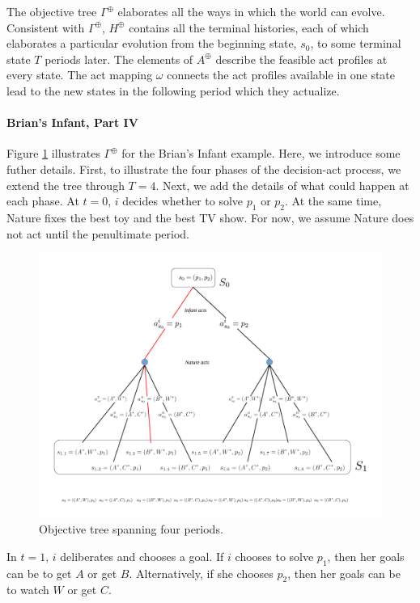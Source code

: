 \documentclass[
11pt,
titlepage,
reqno,
]{article}%
\theoremstyle{definition}
\begin{document}
The objective tree $\Gamma^\oplus$ elaborates all the ways in which the world can evolve.
Consistent with $\Gamma^\oplus$, $H^\oplus$ contains all the terminal histories, each of which elaborates a particular evolution from the beginning state, $s_0$, to some terminal state $T$ periods later.
The elements of $A^\oplus$ describe the feasible act profiles at every state.
The act mapping $\omega$ connects the act profiles available in one state lead to the new states in the following period which they actualize.

\paragraph{Brian's Infant, Part IV}
Figure \ref{Diag: p-04} illustrates $\Gamma^\oplus$ for the Brian's Infant example. 
Here, we introduce some futher details.
First, to illustrate the four phases of the decision-act process, we extend the tree through $T=4$.
Next, we add the details of what could happen at each phase.
At $t=0$, $i$ decides whether to solve $p_1$ or $p_2$.
At the same time, Nature fixes the best toy and the best TV show. 
For now, we assume Nature does not act until the penultimate period.

\begin{figure}[h!]
	\centering
	\includegraphics*[page=4,trim = 0in 0in 0in 0in,scale=.65]{Awareness_Diagrams_All}
	\caption{Objective tree spanning four periods.\label{Diag: p-04}}%
\end{figure}

In $t=1$, $i$ deliberates and chooses a goal. 
If $i$ chooses to solve $p_1$, then her goals can be to get $A$ or get $B$.
Alternatively, if she chooses $p_2$, then her goals can be to watch $W$ or get $C$.
\end{document}

